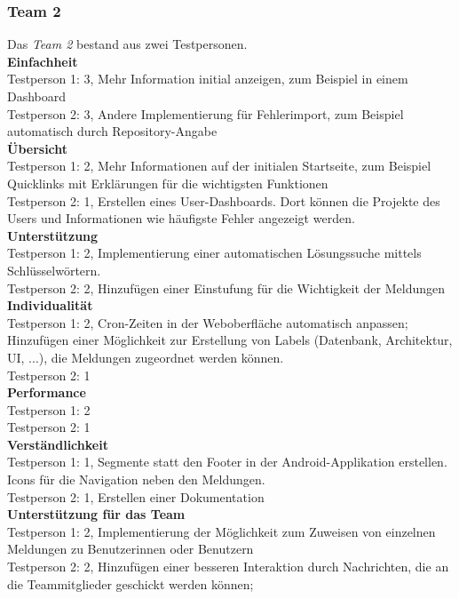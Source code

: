 \subsubsection{Team 2}
Das \textit{Team 2} bestand aus zwei Testpersonen. \\
\textbf{Einfachheit} \\
Testperson 1: 3, Mehr Information initial anzeigen, zum Beispiel in einem Dashboard  \\
Testperson 2: 3, Andere Implementierung für Fehlerimport, zum Beispiel automatisch durch Repository-Angabe\\
\textbf{Übersicht} \\
Testperson 1: 2, Mehr Informationen auf der initialen  Startseite, zum Beispiel Quicklinks mit Erklärungen für die wichtigsten Funktionen\\
Testperson 2: 1, Erstellen eines User-Dashboards. Dort können die Projekte des Users und Informationen wie häufigste Fehler angezeigt werden.\\
\textbf{Unterstützung} \\
Testperson 1: 2, Implementierung einer automatischen Lösungssuche mittels Schlüsselwörtern.  \\
Testperson 2: 2, Hinzufügen einer Einstufung für die Wichtigkeit der Meldungen\\
\textbf{Individualität} \\
Testperson 1: 2, Cron-Zeiten in der Weboberfläche automatisch anpassen; Hinzufügen einer Möglichkeit zur Erstellung von Labels (Datenbank, Architektur, UI, ...), die Meldungen zugeordnet werden können.\\
Testperson 2: 1 \\
\textbf{Performance} \\
Testperson 1: 2 \\
Testperson 2: 1 \\
\textbf{Verständlichkeit} \\
Testperson 1: 1, Segmente statt den Footer in der Android-Applikation erstellen. Icons für die Navigation neben den Meldungen. \\
Testperson 2: 1, Erstellen einer Dokumentation \\
\textbf{Unterstützung für das Team} \\
Testperson 1: 2, Implementierung der Möglichkeit zum Zuweisen von einzelnen Meldungen zu Benutzerinnen oder Benutzern\\
Testperson 2: 2, Hinzufügen einer besseren Interaktion durch Nachrichten, die an die Teammitglieder geschickt werden können; 

